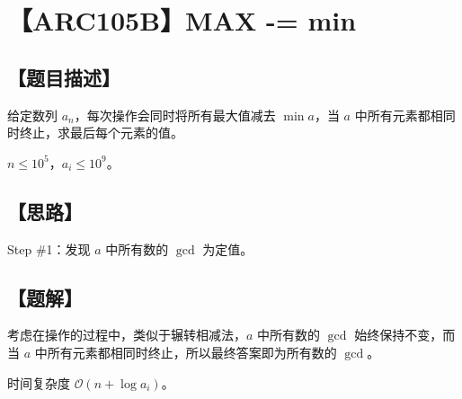\documentclass[UTF8,12pt,a4paper]{ctexart} %
\begin{document}
	\fontsize{12pt}{12pt}\selectfont
	
	\newpage
	\pagestyle{fancy}
	
	\section*{【ARC105B】MAX -= min}
	
	\subsection*{【题目描述】}
	
	给定数列 $a_n$，每次操作会同时将所有最大值减去 $\min{a}$，当 $a$ 中所有元素都相同时终止，求最后每个元素的值。
	
	$n\le10^5$，$a_i\le10^9$。
	
	\subsection*{【思路】}
	
	Step \#1：发现 $a$ 中所有数的 $\gcd$ 为定值。
	
	\subsection*{【题解】}
	
	考虑在操作的过程中，类似于辗转相减法，$a$ 中所有数的 $\gcd$ 始终保持不变，而当 $a$ 中所有元素都相同时终止，所以最终答案即为所有数的 $\gcd$。
	
	时间复杂度 $\mathcal{O}(n+\log a_i)$。
	
\end{document}
